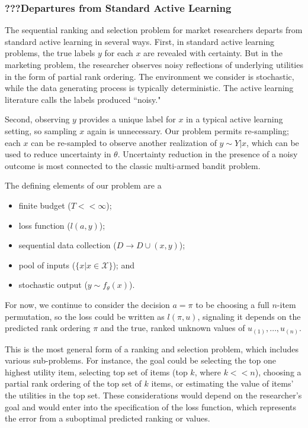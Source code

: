 \documentclass[nonblindrev]{informs3}
\newcommand{\numitems}{n}
\newcommand{\numtopset}{k}
\begin{document}




\subsubsection{???Departures from Standard Active Learning}

The sequential ranking and selection problem for market researchers departs from standard active learning in several ways. First, in standard active learning problems, the true labels $y$ for each $x$ are revealed with certainty. But in the marketing problem, the researcher observes noisy reflections of underlying utilities in the form of partial rank ordering. The environment we consider is stochastic, while the data generating process is typically deterministic. The active learning literature \citep{GolovinEtAl2010noisy,NatarajanEtAl2013noisy} calls the labels produced ``noisy."

Second, observing $y$ provides a unique label for $x$ in a typical active learning setting, so sampling $x$ again is unnecessary. Our problem permits re-sampling; each $x$ can be re-sampled to observe another realization of $y \sim Y|x$, which can be used to reduce uncertainty in $\theta$. Uncertainty reduction in the presence of a noisy outcome is most connected to the classic multi-armed bandit problem. 

The defining elements of our problem are a
\begin{itemize}
	\item finite budget ($T << \infty$);
	\item loss function ($l(a,y)$);
	\item sequential data collection ($D \to D \cup (x,y)$);
	\item pool of inputs ($\{ x | x \in \mathcal{X} \}$); and
	\item stochastic output ($y \sim f_{\theta}(x)$).
\end{itemize}
For now, we continue to consider the decision $a=\pi$ to be choosing a full $\numitems$-item permutation, so the loss could be written as $l(\pi,u)$, signaling it depends on the predicted rank ordering $\pi$ and the true, ranked unknown values of $u_{(1)},\ldots,u_{(\numitems)}$. 

This is the most general form of a ranking and selection problem, which includes various sub-problems. For instance, the goal could be selecting the top one highest utility item, selecting top set of items (top $\numtopset$, where $\numtopset << \numitems$), choosing a partial rank ordering of the top set of $\numtopset$ items, or estimating the value of items' the utilities in the top set. These considerations would depend on the researcher's goal and would enter into the specification of the loss function, which represents the error from a suboptimal predicted ranking or values. 
\end{document}
